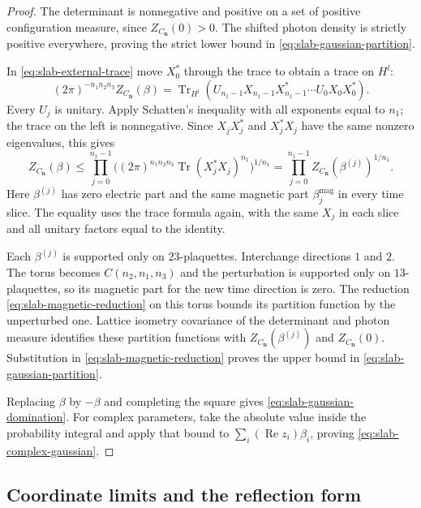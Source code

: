 \begin{proof}
The determinant is nonnegative and positive on a set of positive
configuration measure, since $Z_{C_{\mathbf n}}(0)>0$. The shifted photon
density is strictly positive everywhere, proving the strict lower
bound in \eqref{eq:slab-gaussian-partition}.

In \eqref{eq:slab-external-trace} move $X_0^*$ through the trace to
obtain a trace on $H^l$:
\[
 (2\pi)^{-n_1n_2n_3}Z_{C_{\mathbf n}}(\beta)
       =\operatorname{Tr}_{H^l}
          (U_{n_1-1}X_{n_1-1}X_{n_1-1}^*\cdots U_0X_0X_0^*).
\]
Every $U_j$ is unitary. Apply Schatten's inequality with all exponents
equal to $n_1$; the trace on the left is nonnegative. Since $X_jX_j^*$
and $X_j^*X_j$ have the same nonzero eigenvalues, this gives
\begin{equation}\label{eq:slab-magnetic-reduction}
 Z_{C_{\mathbf n}}(\beta)
       \le\prod_{j=0}^{n_1-1}
            \bigl((2\pi)^{n_1n_2n_3}
                    \operatorname{Tr}(X_j^*X_j)^{n_1}\bigr)^{1/n_1}
       =\prod_{j=0}^{n_1-1}Z_{C_{\mathbf n}}(\beta^{(j)})^{1/n_1}.
\end{equation}
Here $\beta^{(j)}$ has zero electric part and the same magnetic
part $\beta_j^{\mathrm{mag}}$ in every time slice. The equality uses
the trace formula again, with the same $X_j$ in each slice and all
unitary factors equal to the identity.

Each $\beta^{(j)}$ is supported only on $23$-plaquettes. Interchange
directions $1$ and $2$. The torus becomes $C(n_2,n_1,n_3)$ and the
perturbation is supported only on $13$-plaquettes, so its magnetic
part for the new time direction is zero. The reduction
\eqref{eq:slab-magnetic-reduction} on this torus bounds its partition
function by the unperturbed one. Lattice isometry covariance of the
determinant and photon measure identifies these partition functions
with $Z_{C_{\mathbf n}}(\beta^{(j)})$ and $Z_{C_{\mathbf n}}(0)$. Substitution in
\eqref{eq:slab-magnetic-reduction} proves the upper bound in
\eqref{eq:slab-gaussian-partition}.

Replacing $\beta$ by $-\beta$ and completing the square gives
\eqref{eq:slab-gaussian-domination}. For complex parameters, take
the absolute value inside the probability integral and apply that
bound to $\sum_i(\operatorname{Re}z_i)\beta_i$, proving
\eqref{eq:slab-complex-gaussian}.
\end{proof}


\subsection{Coordinate limits and the reflection form}\label{subsec:coordinate-limits}

